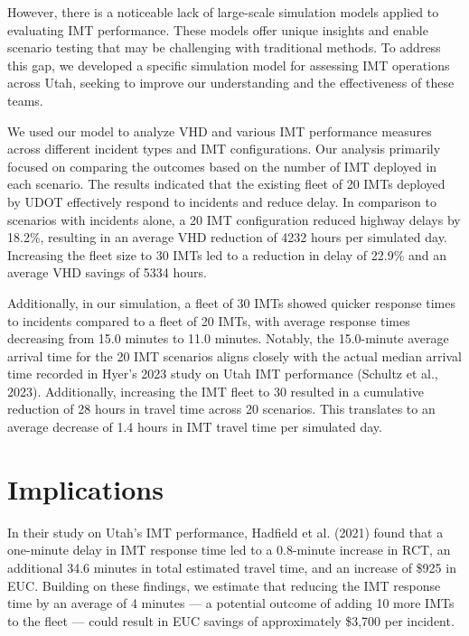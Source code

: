 \documentclass[fancy, oneside, mastersfancy, ms]{byuthesis}
\begin{document}
However, there is a noticeable lack of large-scale simulation models
applied to evaluating IMT performance. These models offer unique
insights and enable scenario testing that may be challenging with
traditional methods. To address this gap, we developed a specific
simulation model for assessing IMT operations across Utah, seeking to
improve our understanding and the effectiveness of these teams.

We used our model to analyze VHD and various IMT performance measures
across different incident types and IMT configurations. Our analysis
primarily focused on comparing the outcomes based on the number of IMT
deployed in each scenario. The results indicated that the existing fleet
of 20 IMTs deployed by UDOT effectively respond to incidents and reduce
delay. In comparison to scenarios with incidents alone, a 20 IMT
configuration reduced highway delays by 18.2\%, resulting in an average
VHD reduction of 4232 hours per simulated day. Increasing the fleet size
to 30 IMTs led to a reduction in delay of 22.9\% and an average VHD
savings of 5334 hours.

Additionally, in our simulation, a fleet of 30 IMTs showed quicker
response times to incidents compared to a fleet of 20 IMTs, with average
response times decreasing from 15.0 minutes to 11.0 minutes. Notably,
the 15.0-minute average arrival time for the 20 IMT scenarios aligns
closely with the actual median arrival time recorded in Hyer's 2023
study on Utah IMT performance (Schultz et al., 2023). Additionally,
increasing the IMT fleet to 30 resulted in a cumulative reduction of 28
hours in travel time across 20 scenarios. This translates to an average
decrease of 1.4 hours in IMT travel time per simulated day.

\hypertarget{sec-implications}{%
\section{Implications}\label{sec-implications}}

In their study on Utah's IMT performance, Hadfield et al. (2021) found
that a one-minute delay in IMT response time led to a 0.8-minute
increase in RCT, an additional 34.6 minutes in total estimated travel
time, and an increase of \$925 in EUC. Building on these findings, we
estimate that reducing the IMT response time by an average of 4 minutes
--- a potential outcome of adding 10 more IMTs to the fleet --- could
result in EUC savings of approximately \$3,700 per incident.
\end{document}
